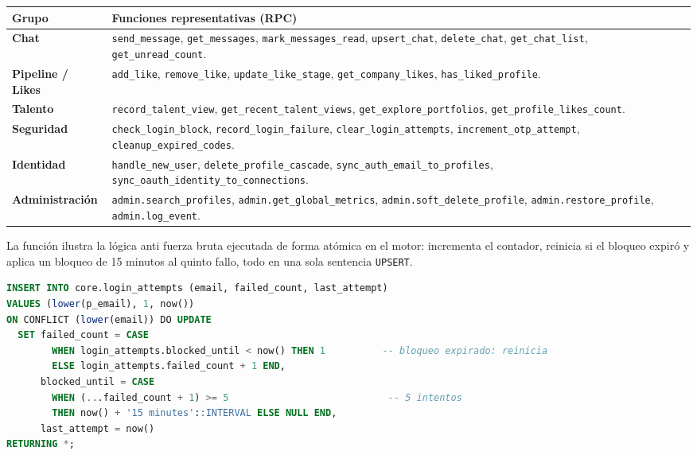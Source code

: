 \vspace{0.2cm}
\noindent
\renewcommand{\arraystretch}{1.25}
\fontsize{8.2}{9.8}\selectfont\sffamily
\begin{tabularx}{\textwidth}{|>{\bfseries\color{colorPrimario}}l|X|}
\hline
\rowcolor{headerTabla}
\textbf{Grupo} & \textbf{Funciones representativas (RPC)} \\
\hline
Chat & \texttt{send\_message}, \texttt{get\_messages}, \texttt{mark\_messages\_read}, \texttt{upsert\_chat}, \texttt{delete\_chat}, \texttt{get\_chat\_list}, \texttt{get\_unread\_count}. \\
\hline
\rowcolor{grisTecnico}
Pipeline / Likes & \texttt{add\_like}, \texttt{remove\_like}, \texttt{update\_like\_stage}, \texttt{get\_company\_likes}, \texttt{has\_liked\_profile}. \\
\hline
Talento & \texttt{record\_talent\_view}, \texttt{get\_recent\_talent\_views}, \texttt{get\_explore\_portfolios}, \texttt{get\_profile\_likes\_count}. \\
\hline
\rowcolor{grisTecnico}
Seguridad & \texttt{check\_login\_block}, \texttt{record\_login\_failure}, \texttt{clear\_login\_attempts}, \texttt{increment\_otp\_attempt}, \texttt{cleanup\_expired\_codes}. \\
\hline
Identidad & \texttt{handle\_new\_user}, \texttt{delete\_profile\_cascade}, \texttt{sync\_auth\_email\_to\_profiles}, \texttt{sync\_oauth\_identity\_to\_connections}. \\
\hline
\rowcolor{grisTecnico}
Administración & \texttt{admin.search\_profiles}, \texttt{admin.get\_global\_metrics}, \texttt{admin.soft\_delete\_profile}, \texttt{admin.restore\_profile}, \texttt{admin.log\_event}. \\
\hline
\end{tabularx}
\label{tab:rpcs}

La función  ilustra la lógica anti fuerza bruta
ejecutada de forma atómica en el motor: incrementa el contador, reinicia si el bloqueo
expiró y aplica un bloqueo de 15 minutos al quinto fallo, todo en una sola sentencia
\texttt{UPSERT}.

\begin{lstlisting}[language=SQL, caption={Función anti fuerza bruta (\texttt{core.record\_login\_failure}, fragmento).}]
INSERT INTO core.login_attempts (email, failed_count, last_attempt)
VALUES (lower(p_email), 1, now())
ON CONFLICT (lower(email)) DO UPDATE
  SET failed_count = CASE
        WHEN login_attempts.blocked_until < now() THEN 1          -- bloqueo expirado: reinicia
        ELSE login_attempts.failed_count + 1 END,
      blocked_until = CASE
        WHEN (...failed_count + 1) >= 5                            -- 5 intentos
        THEN now() + '15 minutes'::INTERVAL ELSE NULL END,
      last_attempt = now()
RETURNING *;
\end{lstlisting}

